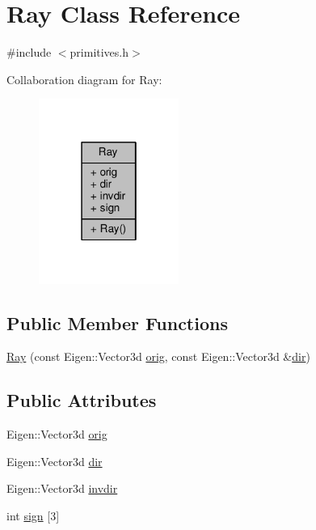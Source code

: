 \hypertarget{class_ray}{}\section{Ray Class Reference}
\label{class_ray}


{\ttfamily \#include $<$primitives.\+h$>$}



Collaboration diagram for Ray\+:
\nopagebreak
\begin{figure}[H]
\begin{center}
\leavevmode
\includegraphics[width=130pt]{class_ray__coll__graph}
\end{center}
\end{figure}
\subsection*{Public Member Functions}
\begin{DoxyCompactItemize}
\item 
\hyperlink{class_ray_a629584b29ff42f0bc196bc41ef3a5233}{Ray} (const Eigen\+::\+Vector3d \hyperlink{class_ray_a21776ed09fa0cff97b5eb3d35cd40c97}{orig}, const Eigen\+::\+Vector3d \&\hyperlink{class_ray_a2983ad86d7a77c150fccad39c7e423fa}{dir})
\end{DoxyCompactItemize}
\subsection*{Public Attributes}
\begin{DoxyCompactItemize}
\item 
Eigen\+::\+Vector3d \hyperlink{class_ray_a21776ed09fa0cff97b5eb3d35cd40c97}{orig}
\item 
Eigen\+::\+Vector3d \hyperlink{class_ray_a2983ad86d7a77c150fccad39c7e423fa}{dir}
\item 
Eigen\+::\+Vector3d \hyperlink{class_ray_ae02778cbe6b925ca200c4492b9c414c4}{invdir}
\item 
int \hyperlink{class_ray_aa9c97528be491d67e22755de4b2a60b7}{sign} \mbox{[}3\mbox{]}
\end{DoxyCompactItemize}


